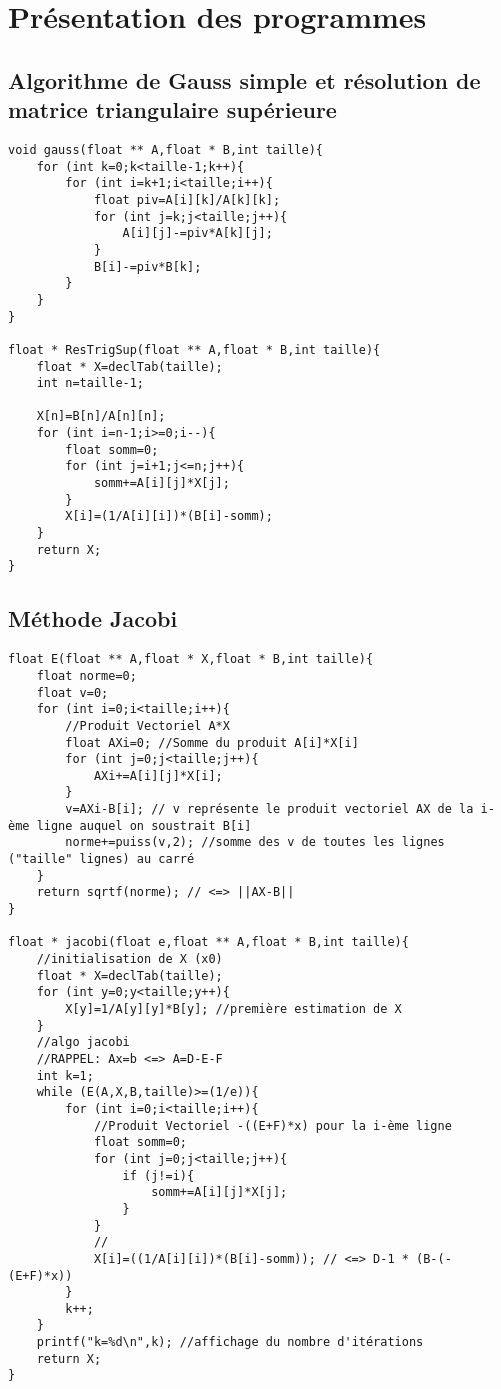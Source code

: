 \documentclass[10pt,a4paper,french]{article}
\begin{document}
\section{Présentation des programmes}
\subsection{Algorithme de Gauss simple et résolution de matrice triangulaire supérieure}

\begin{lstlisting}
void gauss(float ** A,float * B,int taille){
    for (int k=0;k<taille-1;k++){
        for (int i=k+1;i<taille;i++){
            float piv=A[i][k]/A[k][k];
            for (int j=k;j<taille;j++){
                A[i][j]-=piv*A[k][j];
            }
            B[i]-=piv*B[k];
        }
    }
}

float * ResTrigSup(float ** A,float * B,int taille){
    float * X=declTab(taille);
    int n=taille-1;

    X[n]=B[n]/A[n][n];
    for (int i=n-1;i>=0;i--){
        float somm=0;
        for (int j=i+1;j<=n;j++){
            somm+=A[i][j]*X[j];
        }
        X[i]=(1/A[i][i])*(B[i]-somm);
    }
    return X;
}
\end{lstlisting}

\subsection{Méthode Jacobi}
\begin{lstlisting}
float E(float ** A,float * X,float * B,int taille){
    float norme=0;
    float v=0;
    for (int i=0;i<taille;i++){
        //Produit Vectoriel A*X
        float AXi=0; //Somme du produit A[i]*X[i]
        for (int j=0;j<taille;j++){
            AXi+=A[i][j]*X[i];
        }
        v=AXi-B[i]; // v représente le produit vectoriel AX de la i-ème ligne auquel on soustrait B[i]
        norme+=puiss(v,2); //somme des v de toutes les lignes ("taille" lignes) au carré
    }
    return sqrtf(norme); // <=> ||AX-B||
}

float * jacobi(float e,float ** A,float * B,int taille){
    //initialisation de X (x0)
    float * X=declTab(taille);
    for (int y=0;y<taille;y++){
        X[y]=1/A[y][y]*B[y]; //première estimation de X 
    }
    //algo jacobi
    //RAPPEL: Ax=b <=> A=D-E-F
    int k=1;
    while (E(A,X,B,taille)>=(1/e)){
        for (int i=0;i<taille;i++){
            //Produit Vectoriel -((E+F)*x) pour la i-ème ligne
            float somm=0;
            for (int j=0;j<taille;j++){
                if (j!=i){
                    somm+=A[i][j]*X[j];
                }
            }
            //
            X[i]=((1/A[i][i])*(B[i]-somm)); // <=> D-1 * (B-(-(E+F)*x))
        }
        k++;
    }
    printf("k=%d\n",k); //affichage du nombre d'itérations
    return X;
}
\end{lstlisting}
\end{document}

